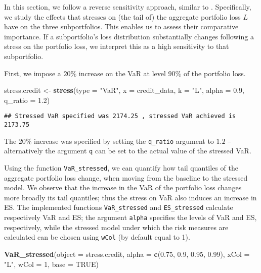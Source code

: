 \documentclass[
]{article}
\newenvironment{Shaded}{\begin{snugshade}}{\end{snugshade}}
\newcommand{\DataTypeTok}[1]{\textcolor[rgb]{0.13,0.29,0.53}{#1}}
\newcommand{\DecValTok}[1]{\textcolor[rgb]{0.00,0.00,0.81}{#1}}
\newcommand{\FloatTok}[1]{\textcolor[rgb]{0.00,0.00,0.81}{#1}}
\newcommand{\KeywordTok}[1]{\textcolor[rgb]{0.13,0.29,0.53}{\textbf{#1}}}
\newcommand{\NormalTok}[1]{#1}
\newcommand{\OtherTok}[1]{\textcolor[rgb]{0.56,0.35,0.01}{#1}}
\newcommand{\StringTok}[1]{\textcolor[rgb]{0.31,0.60,0.02}{#1}}
\begin{document}
In this section, we follow a reverse sensitivity approach, similar to \citet{Pesenti2019}. Specifically, we study the effects that stresses on (the tail of) the aggregate portfolio loss \(L\) have on the three subportfolios. This enables us to assess their comparative importance. If a subportfolio's loss distribution substantially changes following a stress on the portfolio loss, we interpret this as a high sensitivity to that subportfolio.

First, we impose a \(20\%\) increase on the VaR at level \(90\%\) of the portfolio loss.

\begin{Shaded}
\begin{Highlighting}[]
\NormalTok{stress.credit <-}\StringTok{ }\KeywordTok{stress}\NormalTok{(}\DataTypeTok{type =} \StringTok{"VaR"}\NormalTok{, }\DataTypeTok{x =}\NormalTok{ credit_data, }\DataTypeTok{k =} \StringTok{"L"}\NormalTok{, }\DataTypeTok{alpha =} \FloatTok{0.9}\NormalTok{, }
    \DataTypeTok{q_ratio =} \FloatTok{1.2}\NormalTok{)}
\end{Highlighting}
\end{Shaded}

\begin{verbatim}
## Stressed VaR specified was 2174.25 , stressed VaR achieved is 2173.75
\end{verbatim}

The \(20\%\) increase was specified by setting the \texttt{q\_ratio} argument to \(1.2\) -- alternatively the argument \texttt{q} can be set to the actual value of the stressed VaR.

Using the function \texttt{VaR\_stressed}, we can quantify how tail quantiles of the aggregate portfolio loss change, when moving from the baseline to the stressed model. We observe that the increase in the VaR of the portfolio loss changes more broadly its tail quantiles; thus the stress on VaR also induces an increase in ES. The implemented functions \texttt{VaR\_stressed} and \texttt{ES\_stressed} calculate respectively VaR and ES; the argument \texttt{alpha} specifies the levels of VaR and ES, respectively, while the stressed model under which the risk measures are calculated can be chosen using \texttt{wCol} (by default equal to 1).

\begin{Shaded}
\begin{Highlighting}[]
\KeywordTok{VaR_stressed}\NormalTok{(}\DataTypeTok{object =}\NormalTok{ stress.credit, }\DataTypeTok{alpha =} \KeywordTok{c}\NormalTok{(}\FloatTok{0.75}\NormalTok{, }\FloatTok{0.9}\NormalTok{, }\FloatTok{0.95}\NormalTok{, }\FloatTok{0.99}\NormalTok{), }
    \DataTypeTok{xCol =} \StringTok{"L"}\NormalTok{, }\DataTypeTok{wCol =} \DecValTok{1}\NormalTok{, }\DataTypeTok{base =} \OtherTok{TRUE}\NormalTok{)}
\end{Highlighting}
\end{Shaded}
\end{document}
